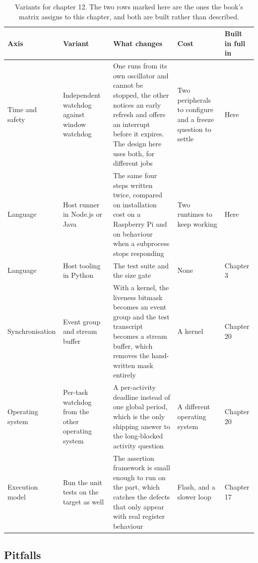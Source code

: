 \begin{table}[H]\centering\small
\begin{tabular}{p{24mm}p{26mm}p{44mm}p{22mm}p{20mm}}
\toprule
Axis & Variant & What changes & Cost & Built in full in \\
\midrule
Time and safety & Independent watchdog against window watchdog & One runs from its own oscillator and cannot be stopped, the other notices an early refresh and offers an interrupt before it expires. The design here uses both, for different jobs & Two peripherals to configure and a freeze question to settle & Here \\
Language & Host runner in Node.js or Java & The same four steps written twice, compared on installation cost on a Raspberry Pi and on behaviour when a subprocess stops responding & Two runtimes to keep working & Here \\
Language & Host tooling in Python & The test suite and the size gate & None & Chapter 3 \\
Synchronisation & Event group and stream buffer & With a kernel, the liveness bitmask becomes an event group and the test transcript becomes a stream buffer, which removes the hand-written mask entirely & A kernel & Chapter 20 \\
Operating system & Per-task watchdog from the other operating system & A per-activity deadline instead of one global period, which is the only shipping answer to the long-blocked activity question & A different operating system & Chapter 20 \\
Execution model & Run the unit tests on the target as well & The assertion framework is small enough to run on the part, which catches the defects that only appear with real register behaviour & Flash, and a slower loop & Chapter 17 \\
\bottomrule
\end{tabular}
\caption{Variants for chapter 12. The two rows marked here are the ones the book's matrix assigns to this chapter, and both are built rather than described.}
\end{table}

\subsection*{Pitfalls}

